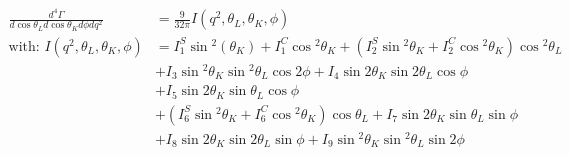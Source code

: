 \documentclass[english]{uzhpub}
\begin{document}
\begin{equation}
 \begin{split}
  \frac{d^4 \Gamma}{d \cos{ \theta_L} d \cos{\theta_K} d \phi d q^2} &= \frac{9}{32 \pi} I(q^2,\theta_L, \theta_K, \phi) \\
  \text{with: } I(q^2,\theta_L, \theta_K, \phi) &= I_1^S \sin{^2(\theta_K)} + I_1^C \cos{^2 \theta_K} + \left(I_2^S \sin{^2 \theta_K} + I_2^C \cos{^2 \theta_K} \right) \cos{^2\theta_L} \\
  &+ I_3 \sin{^2 \theta_K} \sin{^2 \theta_L} \cos{2\phi} + I_4 \sin{2\theta_K} \sin{2\theta_L} \cos{\phi} \\
  &+ I_5 \sin{2\theta_K} \sin{ \theta_L} \cos{ \phi} \\
  &+ \left(I_6^S \sin{^2 \theta_K} + I_6^C \cos{^2 \theta_K}  \right) \cos{ \theta_L} + I_7 \sin{ 2\theta_K} \sin{\theta_L} \sin{\phi} \\
  &+ I_8 \sin{ 2\theta_K} \sin{ 2\theta_L} \sin{ \phi} + I_9 \sin{^2 \theta_K} \sin{^2 \theta_L} \sin{2 \phi}\\
 \end{split}
 \label{eq:diff_decay_rate}
\end{equation}
\end{document}
